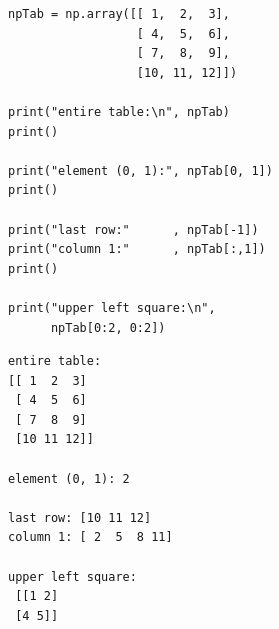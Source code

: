 \begin{frame}[fragile]
%
\begin{tcbraster}[raster columns=2,
                  raster equal height,
                  nobeforeafter,
                  raster column skip=0.2cm]
\begin{codebox}
\begin{verbatim}
npTab = np.array([[ 1,  2,  3],
                  [ 4,  5,  6],
                  [ 7,  8,  9],
                  [10, 11, 12]])

print("entire table:\n", npTab)
print()

print("element (0, 1):", npTab[0, 1])
print()

print("last row:"      , npTab[-1])
print("column 1:"      , npTab[:,1])
print()

print("upper left square:\n",
      npTab[0:2, 0:2])
\end{verbatim}
\end{codebox}
%
\begin{cmdbox}
\begin{verbatim}
entire table:
[[ 1  2  3]
 [ 4  5  6]
 [ 7  8  9]
 [10 11 12]]
 
element (0, 1): 2

last row: [10 11 12]
column 1: [ 2  5  8 11]

upper left square:
 [[1 2]
 [4 5]]
\end{verbatim}
\end{cmdbox}
\end{tcbraster}
%
\end{frame}


